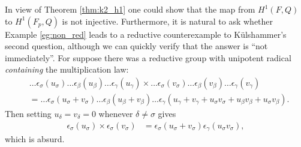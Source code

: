 In view of Theorem \ref{thm:k2_h1} one could show that the map from $H^1(F, Q)$ to $H^1(F_p, Q)$ is not injective. Furthermore, it is natural to ask whether Example \ref{eg:non_red} leads to a reductive counterexample to K\"ulshammer's second question, although we can quickly verify that the answer is ``not immediately''. For suppose there was a reductive group with unipotent radical \emph{containing} the multiplication law:
\begin{align*}
	&\ldots \epsilon_\sigma(u_\sigma) \ldots \epsilon_\beta(u_\beta) \ldots \epsilon_\gamma(u_\gamma) \times
	\ldots \epsilon_\sigma(v_\sigma) \ldots \epsilon_\beta(v_\beta) \ldots \epsilon_\gamma(v_\gamma)\\
	&=
	\ldots \epsilon_\sigma(u_\sigma + v_\sigma) \ldots \epsilon_\beta(u_\beta + v_\beta) \ldots \epsilon_\gamma(u_\gamma + v_\gamma + u_\sigma v_\sigma + u_\beta v_\beta + u_\sigma v_\beta).
\end{align*}
Then setting $u_\delta = v_\delta = 0$ whenever $\delta \neq \sigma$ gives
\begin{align*}
	\epsilon_\sigma(u_\sigma) \times \epsilon_\sigma(v_\sigma) &= \epsilon_\sigma(u_\sigma + v_\sigma) \epsilon_\gamma(u_\sigma v_\sigma),
\end{align*}
which is absurd.


